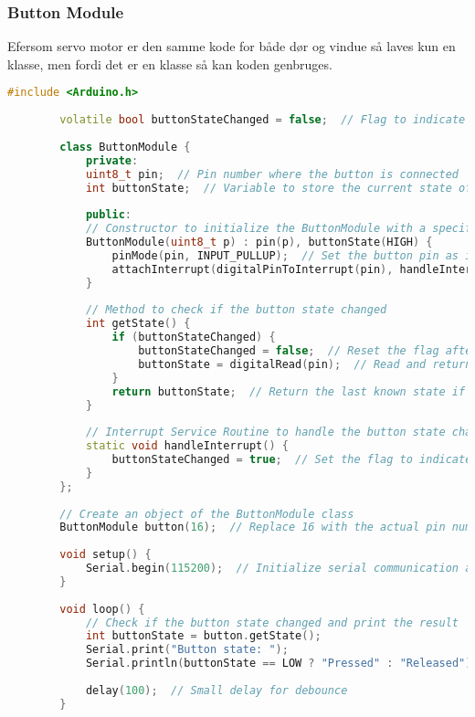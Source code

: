 	\subsubsection*{Button Module}
	Efersom servo motor er den samme kode for både dør og vindue så laves kun en klasse, men fordi det er en klasse så kan koden genbruges.
	\begin{lstlisting}[language=C++]
		#include <Arduino.h>
		
		volatile bool buttonStateChanged = false;  // Flag to indicate button state change
		
		class ButtonModule {
			private:
			uint8_t pin;  // Pin number where the button is connected
			int buttonState;  // Variable to store the current state of the button
			
			public:
			// Constructor to initialize the ButtonModule with a specific pin
			ButtonModule(uint8_t p) : pin(p), buttonState(HIGH) {
				pinMode(pin, INPUT_PULLUP);  // Set the button pin as input with internal pull-up
				attachInterrupt(digitalPinToInterrupt(pin), handleInterrupt, CHANGE);  // Attach interrupt to handle button state change
			}
			
			// Method to check if the button state changed
			int getState() {
				if (buttonStateChanged) {
					buttonStateChanged = false;  // Reset the flag after reading
					buttonState = digitalRead(pin);  // Read and return the current state of the button
				}
				return buttonState;  // Return the last known state if no change
			}
			
			// Interrupt Service Routine to handle the button state change
			static void handleInterrupt() {
				buttonStateChanged = true;  // Set the flag to indicate button state change
			}
		};
		
		// Create an object of the ButtonModule class
		ButtonModule button(16);  // Replace 16 with the actual pin number if necessary
		
		void setup() {
			Serial.begin(115200);  // Initialize serial communication at 115200 baud rate
		}
		
		void loop() {
			// Check if the button state changed and print the result
			int buttonState = button.getState();
			Serial.print("Button state: ");
			Serial.println(buttonState == LOW ? "Pressed" : "Released");
			
			delay(100);  // Small delay for debounce
		}
	\end{lstlisting}
	\clearpage
